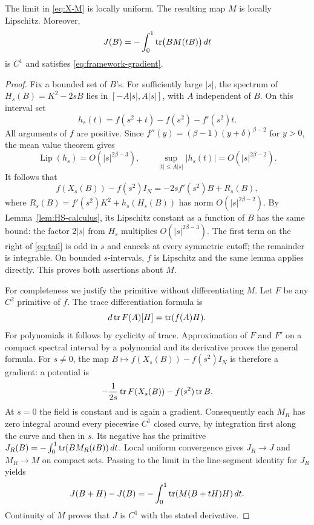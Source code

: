 \begin{lemma}\label{lem:field-regularity}
The limit in \eqref{eq:X-M} is locally uniform. The resulting map $M$ is
locally Lipschitz. Moreover,
\begin{equation}\label{eq:J}
 J(B)=-\int_0^1\operatorname{tr}\bigl(BM(tB)\bigr)\,dt
\end{equation}
is $C^1$ and satisfies \eqref{eq:framework-gradient}.
\end{lemma}
\begin{proof}
Fix a bounded set of $B$'s. For sufficiently large $|s|$, the spectrum of
$H_s(B)=K^2-2sB$ lies in $[-A|s|,A|s|]$, with $A$ independent of $B$.
On this interval set
\[
 h_s(t)=f(s^2+t)-f(s^2)-f'(s^2)t.
\]
All arguments of $f$ are positive. Since
$f''(y)=(\beta-1)(y+\delta)^{\beta-2}$ for $y>0$, the mean value theorem gives
\[
 \operatorname{Lip}(h_s)=O(|s|^{2\beta-3}),\qquad
 \sup_{|t|\le A|s|}|h_s(t)|=O(|s|^{2\beta-2}).
\]
It follows that
\begin{equation}\label{eq:tail}
 f(X_s(B))-f(s^2)I_N=-2s f'(s^2)B+R_s(B),
\end{equation}
where $R_s(B)=f'(s^2)K^2+h_s(H_s(B))$ has norm
$O(|s|^{2\beta-2})$. By Lemma~\ref{lem:HS-calculus}, its Lipschitz constant
as a function of $B$ has the same bound: the factor $2|s|$ from $H_s$ multiplies
$O(|s|^{2\beta-3})$. The first term on the right of \eqref{eq:tail} is odd
in $s$ and cancels at every symmetric cutoff; the remainder is integrable.
On bounded $s$-intervals, $f$ is Lipschitz and the same lemma applies directly.
This proves both assertions about $M$.

For completeness we justify the primitive without differentiating $M$.
Let $F$ be any $C^2$ primitive of $f$. The trace differentiation formula is
\begin{equation}\label{eq:trace-derivative}
 d\operatorname{tr} F(A)[H]=\operatorname{tr}(f(A)H).
\end{equation}
For polynomials it follows by cyclicity of trace. Approximation of $F$ and
$F'$ on a compact spectral interval by a polynomial and its derivative
proves the general formula. For $s\ne0$, the map
$B\mapsto f(X_s(B))-f(s^2)I_N$ is therefore a gradient: a potential is
\[
 -\frac{1}{2s}\operatorname{tr} F(X_s(B))-f(s^2)\operatorname{tr} B.
\]
At $s=0$ the field is constant and is again a gradient. Consequently each
$M_R$ has zero integral around every piecewise $C^1$ closed curve, by
integration first along the curve and then in $s$. Its negative has the
primitive
$J_R(B)=-\int_0^1\operatorname{tr}(BM_R(tB))\,dt$.
Local uniform convergence gives $J_R\to J$ and $M_R\to M$ on compact sets.
Passing to the limit in the line-segment identity for $J_R$ yields
\[
 J(B+H)-J(B)=-\int_0^1\operatorname{tr}(M(B+tH)H)\,dt.
\]
Continuity of $M$ proves that $J$ is $C^1$ with the stated derivative.
\end{proof}

